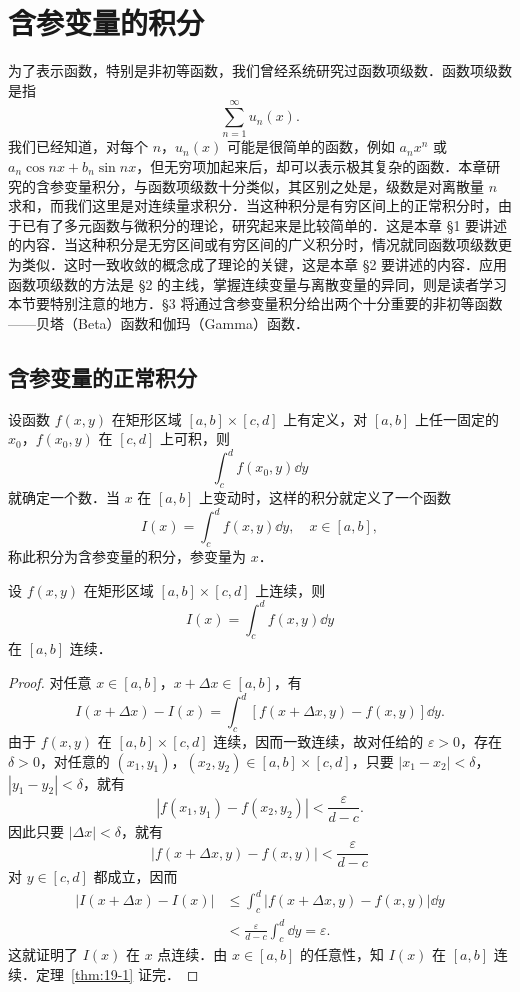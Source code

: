 \chapter{含参变量的积分}

为了表示函数，特别是非初等函数，我们曾经系统研究过函数项级数．函数项级数是指
\[
\sum_{n=1}^{\infty}u_{n}(x).
\]
我们已经知道，对每个 $n$，$u_{n}(x)$ 可能是很简单的函数，例如 $a_{n}x^{n}$ 或 $a_{n}\cos nx+b_{n}\sin nx$，但无穷项加起来后，却可以表示极其复杂的函数．本章研究的含参变量积分，与函数项级数十分类似，其区别之处是，级数是对离散量 $n$ 求和，而我们这里是对连续量求积分．当这种积分是有穷区间上的正常积分时，由于已有了多元函数与微积分的理论，研究起来是比较简单的．这是本章 §1 要讲述的内容．当这种积分是无穷区间或有穷区间的广义积分时，情况就同函数项级数更为类似．这时一致收敛的概念成了理论的关键，这是本章 §2 要讲述的内容．应用函数项级数的方法是 §2 的主线，掌握连续变量与离散变量的异同，则是读者学习本节要特别注意的地方．§3 将通过含参变量积分给出两个十分重要的非初等函数——贝塔（Beta）函数和伽玛（Gamma）函数．

\section{含参变量的正常积分}

设函数 $f(x,y)$ 在矩形区域 $[a,b]\times[c,d]$ 上有定义，对 $[a,b]$ 上任一固定的 $x_{0}$，$f(x_{0},y)$ 在 $[c,d]$ 上可积，则
\[
\int_{c}^{d}f(x_{0},y)\dd y
\]
就确定一个数．当 $x$ 在 $[a,b]$ 上变动时，这样的积分就定义了一个函数
\[
I(x)=\int_{c}^{d}f(x,y)\dd y,\quad x\in[a,b],
\]
称此积分为含参变量的积分，参变量为 $x$．

\begin{theorem}[积分号下取极限]\label{thm:19-1}
设 $f(x,y)$ 在矩形区域 $[a,b]\times[c,d]$ 上连续，则
\[
I(x)=\int_{c}^{d}f(x,y)\dd y
\]
在 $[a,b]$ 连续．
\end{theorem}

\begin{proof}
对任意 $x\in[a,b]$，$x+\Delta x\in[a,b]$，有
\[
I(x+\Delta x)-I(x)=\int_{c}^{d}\left[f(x+\Delta x,y)-f(x,y)\right]\dd y.
\]
由于 $f(x,y)$ 在 $[a,b]\times[c,d]$ 连续，因而一致连续，故对任给的 $\varepsilon>0$，存在 $\delta>0$，对任意的 $(x_{1},y_{1})$，$(x_{2},y_{2})\in[a,b]\times[c,d]$，只要 $|x_{1}-x_{2}|<\delta$，$|y_{1}-y_{2}|<\delta$，就有
\[
|f(x_{1},y_{1})-f(x_{2},y_{2})|<\frac{\varepsilon}{d-c}.
\]
因此只要 $|\Delta x|<\delta$，就有
\[
|f(x+\Delta x,y)-f(x,y)|<\frac{\varepsilon}{d-c}
\]
对 $y\in[c,d]$ 都成立，因而
\[
\begin{aligned}
|I(x+\Delta x)-I(x)|&\leqslant\int_{c}^{d}|f(x+\Delta x,y)-f(x,y)|\dd y\\
&<\frac{\varepsilon}{d-c}\int_{c}^{d}\dd y=\varepsilon.
\end{aligned}
\]
这就证明了 $I(x)$ 在 $x$ 点连续．由 $x\in[a,b]$ 的任意性，知 $I(x)$ 在 $[a,b]$ 连续．定理~\ref{thm:19-1} 证完．
\end{proof}

